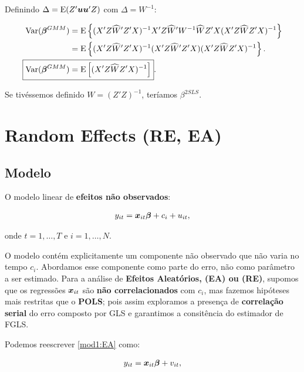 \documentclass[11pt, oneside, a4paper, article]{article}
\numberwithin{equation}{section}
\begin{document}
\noindent
Definindo $\Delta = \text{E}(Z' \boldsymbol{u}\boldsymbol{u}' Z)$ com $\Delta = W^{-1}$:

\vspace{-1 em}
\begin{align*}
\Var( \mbs{\beta}^{GMM} ) &=
\E \left\{ 
( X' Z \widehat{W}' Z' X )^{-1}
X' Z \widehat{W}' W^{-1} \widehat{W} Z' X 
( X' Z \widehat{W} Z' X )^{-1}
\right\}
\\ &=
\E \left\{ 
( X' Z \widehat{W}' Z' X )^{-1}
( X' Z \widehat{W}' Z' X )
( X' Z \widehat{W} Z' X )^{-1}
\right\}.
\\
\Aboxed{
\Var( \mbs{\beta}^{GMM} ) &=
\E \left[
( X' Z \widehat{W} Z' X )^{-1}
\right] }.
\end{align*}

\noindent
Se tivéssemos definido $W = (Z'Z)^{-1}$, teríamos $\beta^{2SLS}$.

\clearpage
\section{Random Effects (RE, EA)}


\subsection*{Modelo}

O modelo linear de \textbf{efeitos não observados}:

\vspace{-1 em}
\begin{align} \label{mod1:EA}
	y_{it} = \boldsymbol{x}_{it} \boldsymbol{\beta} + c_{i} + u_{it},
\end{align}

\noindent
onde
$t = 1, \dots, T$ e $i = 1, \dots, N$.

O modelo contém explicitamente um componente não observado que não varia no tempo $c_{i}$.
Abordamos esse componente como parte do erro, não como parâmetro a ser estimado.
Para a análise de \textbf{Efeitos Aleatórios, (EA) ou (RE)}, supomos que os regressões $\boldsymbol{x}_{it}$ são \textbf{não correlacionados} com $c_{i}$, mas fazemos hipóteses mais restritas que o \textbf{POLS}; pois assim exploramos a presença de \textbf{correlação serial} do erro composto por GLS e garantimos a consitência do estimador de FGLS.

Podemos reescrever \eqref{mod1:EA} como:

\vspace{-1 em}
\begin{align} \label{mod2:EA}
	y_{it} = \boldsymbol{x}_{it} \boldsymbol{\beta} + v_{it},
\end{align}
\end{document}
